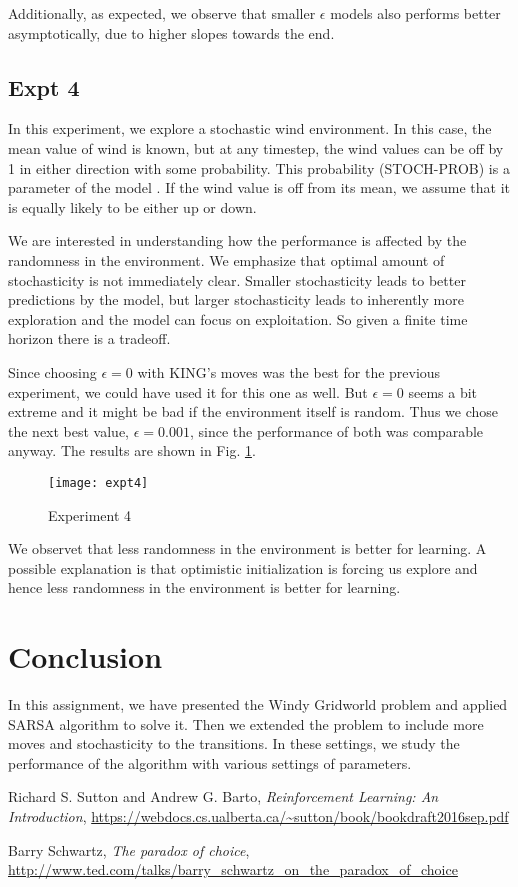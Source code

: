 \documentclass{article}
\begin{document}
    Additionally, as expected, we observe that smaller $\epsilon$ models also performs better asymptotically, due to higher slopes towards the end.
    
\subsection{Expt 4}
    In this experiment, we explore a stochastic wind environment. In this case, the mean value of wind is known, but at any timestep, the wind values can be off by 1 in either direction with some probability. This probability (STOCH-PROB) is a parameter of the model . If the wind value is off from its mean, we assume that it is equally likely to be either up or down.
    
    We are interested in understanding how the performance is affected by the randomness in the environment. We emphasize that optimal amount of stochasticity is not immediately clear. Smaller stochasticity leads to better predictions by the model, but larger stochasticity leads to inherently more exploration and the model can focus on exploitation. So given a finite time horizon there is a tradeoff.
    
    Since choosing $\epsilon=0$ with KING's moves was the best for the previous experiment, we could have used it for this one as well. But $\epsilon=0$ seems a bit extreme and it might be bad if the environment itself is random. Thus we chose the next best value, $\epsilon=0.001$, since the performance of both was comparable anyway. The results are shown in Fig. \ref{fig:expt4}. 
    
    \begin{figure}[!h]
        \centering
        \texttt{[image: expt4]}
        \caption{Experiment 4}
        \label{fig:expt4}
    \end{figure}
    
    We observet that less randomness in the environment is better for learning. A possible explanation is that optimistic initialization is forcing us explore and hence less randomness in the environment is better for learning.

\section{Conclusion}
In this assignment, we have presented the Windy Gridworld problem and applied SARSA algorithm to solve it. Then we extended the problem to include more moves and stochasticity to the transitions. In these settings, we study the performance of the algorithm with various settings of parameters.

\clearpage

\begin{thebibliography}{9}

  Richard S. Sutton and Andrew G. Barto,
  \emph{Reinforcement Learning: An Introduction},
  \url{https://webdocs.cs.ualberta.ca/~sutton/book/bookdraft2016sep.pdf}

  Barry Schwartz,
  \emph{The paradox of choice},
  \url{http://www.ted.com/talks/barry_schwartz_on_the_paradox_of_choice}
  
\end{thebibliography}
\end{document}
